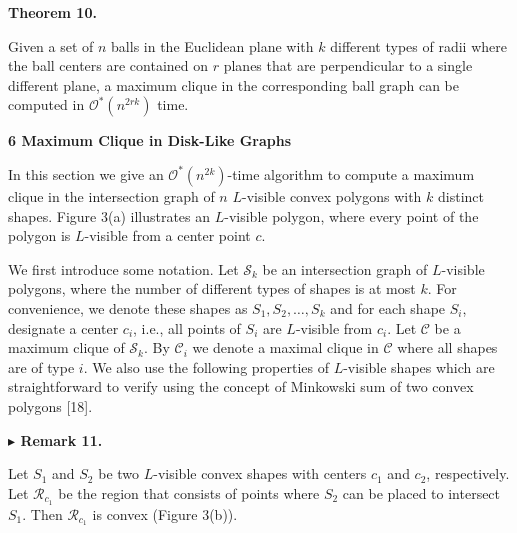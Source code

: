 \documentclass[10pt,a4paper]{amsart}
\begin{document}
\par
\par
\par\medskip\noindent\textbf{Theorem 10.}\par
Given a set of $n$ balls in the Euclidean plane with $k$ different types of radii where the ball centers are contained on $r$ planes that are perpendicular to a single different plane, a maximum clique in the corresponding ball graph can be computed in $\mathcal{O}^{*}(n^{2rk})$ time.
\par
\par
\par
\par
\par

\par\medskip\noindent\textbf{6 Maximum Clique in Disk-Like Graphs}\par
In this section we give an $\mathcal{O}^{*}(n^{2k})$-time algorithm to compute a maximum clique in the intersection graph of $n$ $L$-visible convex polygons with $k$ distinct shapes. Figure 3(a) illustrates an $L$-visible polygon, where every point of the polygon is $L$-visible from a center point $c$.
\par
\par
We first introduce some notation. Let $\mathcal{S}_{k}$ be an intersection graph of $L$-visible polygons, where the number of different types of shapes is at most $k$. For convenience, we denote these shapes as $S_{1},S_{2},\ldots,S_{k}$ and for each shape $S_{i}$, designate a center $c_{i}$, i.e., all points of $S_{i}$ are $L$-visible from $c_{i}$. Let $\mathcal{C}$ be a maximum clique of $\mathcal{S}_{k}$. By $\mathcal{C}_{i}$ we denote a maximal clique in $\mathcal{C}$ where all shapes are of type $i$. We also use the following properties of $L$-visible shapes which are straightforward to verify using the concept of Minkowski sum of two convex polygons [18].
\par
\par
\par\medskip\noindent\textbf{$\blacktriangleright$ Remark 11.}\par
Let $S_{1}$ and $S_{2}$ be two $L$-visible convex shapes with centers $c_{1}$ and $c_{2}$, respectively. Let $\mathcal{R}_{c_{1}}$ be the region that consists of points where $S_{2}$ can be placed to intersect $S_{1}$. Then $\mathcal{R}_{c_{1}}$ is convex (Figure 3(b)).
\par
\par
\end{document}
